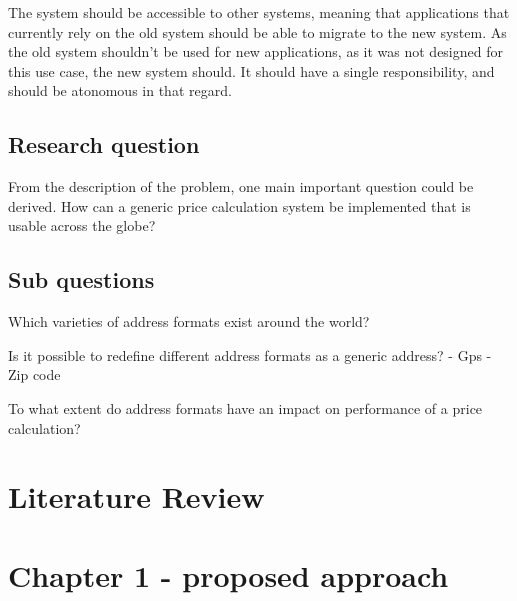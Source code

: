 \documentclass[11pt,conference]{IEEEtran}
\begin{document}
The system should be accessible to other systems, meaning that applications that currently rely on the old system should be able to migrate to the new system. As the old system shouldn't be used for new applications, as it was not designed for this use case, the new system should. It should have a single responsibility, and should be atonomous in that regard.

\subsection{Research question}
From the description of the problem, one main important question could be derived. How can a generic price calculation system be implemented that is usable across the globe?

\subsection{Sub questions}
Which varieties of address formats exist around the world?

Is it possible to redefine different address formats as a generic address?
- Gps
- Zip code

To what extent do address formats have an impact on performance of a price calculation?


%
\section{Literature Review}

%
\section{Chapter 1 - proposed approach}

%
\end{document}
